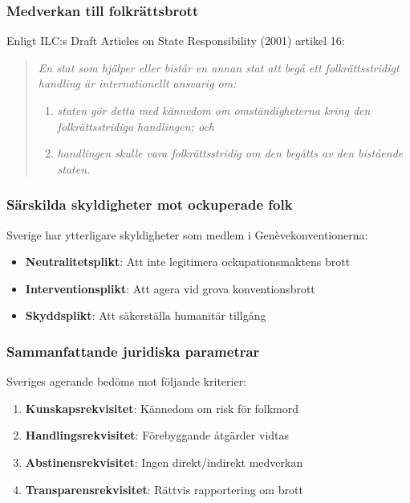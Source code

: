 \subsubsection{Medverkan till folkrättsbrott}
Enligt ILC:s Draft Articles on State Responsibility (2001) artikel 16:
\begin{quote}
\textit{En stat som hjälper eller bistår en annan stat att begå ett folkrättsstridigt handling är internationellt ansvarig om:}
\begin{enumerate}
\item \textit{staten gör detta med kännedom om omständigheterna kring den folkrättsstridiga handlingen; och}
\item \textit{handlingen skulle vara folkrättsstridig om den begåtts av den bistående staten.}
\end{enumerate}
\end{quote}

\subsubsection{Särskilda skyldigheter mot ockuperade folk}
Sverige har ytterligare skyldigheter som medlem i Genèvekonventionerna:
\begin{itemize}
\item \textbf{Neutralitetsplikt}: Att inte legitimera ockupationsmaktens brott
\item \textbf{Interventionsplikt}: Att agera vid grova konventionsbrott
\item \textbf{Skyddsplikt}: Att säkerställa humanitär tillgång
\end{itemize}

\subsubsection{Sammanfattande juridiska parametrar}
Sveriges agerande bedöms mot följande kriterier:
\begin{enumerate}
\item \textbf{Kunskapsrekvisitet}: Kännedom om risk för folkmord
\item \textbf{Handlingsrekvisitet}: Förebyggande åtgärder vidtas
\item \textbf{Abstinensrekvisitet}: Ingen direkt/indirekt medverkan
\item \textbf{Transparensrekvisitet}: Rättvis rapportering om brott
\end{enumerate}